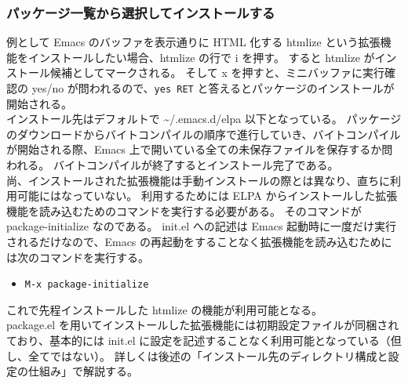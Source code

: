 \subsubsection{パッケージ一覧から選択してインストールする}
例として Emacs のバッファを表示通りに HTML 化する htmlize という拡張機能をインストールしたい場合、htmlize の行で i を押す。
すると htmlize がインストール候補としてマークされる。
そして x を押すと、ミニバッファに実行確認の yes/no が問われるので、\texttt{yes RET} と答えるとパッケージのインストールが開始される。\\

インストール先はデフォルトで \textasciitilde{}/.emacs.d/elpa 以下となっている。
パッケージのダウンロードからバイトコンパイルの順序で進行していき、バイトコンパイルが開始される際、Emacs 上で開いている全ての未保存ファイルを保存するか問われる。
バイトコンパイルが終了するとインストール完了である。\\

尚、インストールされた拡張機能は手動インストールの際とは異なり、直ちに利用可能にはなっていない。
利用するためには ELPA からインストールした拡張機能を読み込むためのコマンドを実行する必要がある。
そのコマンドが package-initialize なのである。
init.el への記述は Emacs 起動時に一度だけ実行されるだけなので、Emacs の再起動をすることなく拡張機能を読み込むためには次のコマンドを実行する。
\begin{itemize}\setlength{\leftskip}{-1.00zw}%
\item[] \texttt{M-x package-initialize}
\end{itemize}
これで先程インストールした htmlize の機能が利用可能となる。\\

package.el を用いてインストールした拡張機能には初期設定ファイルが同梱されており、基本的には init.el に設定を記述することなく利用可能となっている（但し、全てではない）。
詳しくは後述の「インストール先のディレクトリ構成と設定の仕組み」で解説する。
